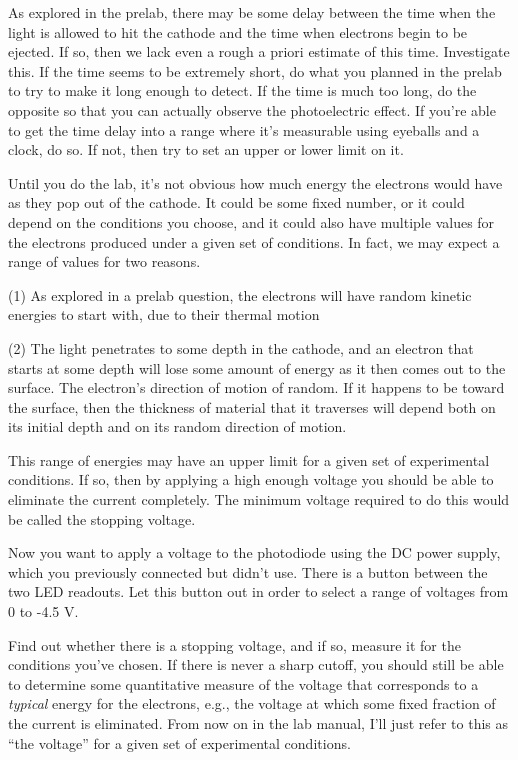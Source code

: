 
As explored in the prelab, there may be some
delay between the time when the light
is allowed to hit the cathode and the time when electrons begin to be ejected.
If so, then we lack even a rough a priori estimate of this time.
Investigate this. If the time seems to be extremely short, do what you planned in the
prelab to try to make it long enough to detect. If the time is much too long, do the
opposite so that you can actually observe the photoelectric effect. If you're able to get the time
delay into a range where it's measurable using eyeballs and a clock, do so. If not,
then try to set an upper or lower limit on it.


Until you do the lab, it's not obvious how much energy the electrons would have
as they pop out of the cathode. It could be some fixed number, or it could depend on the
conditions you choose, and it could also have multiple values for the electrons produced
under a given set of conditions. In fact, we may expect a range of values for two reasons.

(1) As explored in a prelab question, the electrons will have random kinetic energies to start
with, due to their thermal motion

(2) The light penetrates to some depth in the cathode,
and an electron that starts at some depth will lose some amount of energy as it then comes out
to the surface. The electron's direction of motion of random. If it happens to be toward the
surface, then the thickness of material that it traverses will depend both on its initial
depth and on its random direction of motion.

This range of energies may have an upper limit for a given set of experimental conditions.
If so, then by applying a high enough voltage you should be able to eliminate the current
completely. The minimum voltage required to do this would be called the stopping voltage.

Now you want to apply a voltage to the photodiode using the DC power supply, which you previously
connected but didn't use.
There is a button between the
two LED readouts. Let this button out in order to select a range of voltages from 0 to -4.5 V.

Find out whether there is a stopping voltage, and if so, measure it for the conditions you've chosen.
If there is never a sharp cutoff, you should still be able to determine some quantitative measure
of the voltage that corresponds to a \emph{typical} energy for the electrons, e.g., the voltage at
which some fixed fraction of the current is eliminated. From now on in the lab manual, I'll
just refer to this as ``the voltage'' for a given set of experimental conditions.

